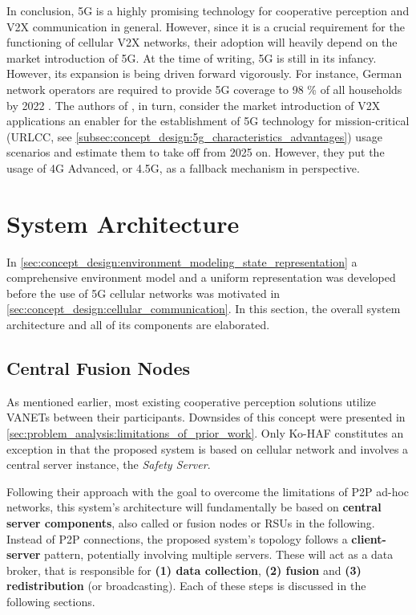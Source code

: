 In conclusion, 5G is a highly promising technology for cooperative perception and V2X communication in general. However, since it is a crucial requirement for the functioning of cellular V2X networks, their adoption will heavily depend on the market introduction of 5G. At the time of writing, 5G is still in its infancy. However, its expansion is being driven forward vigorously. For instance, German network operators are required to provide 5G coverage to 98 \% of all households by 2022 \cite{DeutscheWelle2019}. The authors of \cite{CCSInsight2018}, in turn, consider the market introduction of V2X applications an enabler for the establishment of 5G technology for mission-critical (URLCC, see \autoref{subsec:concept_design:5g_characteristics_advantages}) usage scenarios and estimate them to take off from 2025 on. However, they put the usage of 4G Advanced, or 4.5G, as a fallback mechanism in perspective.

\section{System Architecture}
\label{sec:concept_design:system_architecture}
In \autoref{sec:concept_design:environment_modeling_state_representation} a comprehensive environment model and a uniform representation was developed before the use of 5G cellular networks was motivated in \autoref{sec:concept_design:cellular_communication}. In this section, the overall system architecture and all of its components are elaborated.

\subsection{Central Fusion Nodes}
\label{subsec:concept_design:central_fusion_nodes}
As mentioned earlier, most existing cooperative perception solutions utilize VANETs between their participants. Downsides of this concept were presented in \autoref{sec:problem_analysis:limitations_of_prior_work}. Only Ko-HAF \cite{Hohm2019} constitutes an exception in that the proposed system is based on cellular network and involves a central server instance, the \textit{Safety Server}.

Following their approach with the goal to overcome the limitations of P2P ad-hoc networks, this system's architecture will fundamentally be based on \textbf{central server components}, also called or fusion nodes or RSUs in the following. Instead of P2P connections, the proposed system's topology follows a \textbf{client-server} pattern, potentially involving multiple servers. These will act as a data broker, that is responsible for \textbf{(1) data collection}, \textbf{(2) fusion} and \textbf{(3) redistribution} (or broadcasting). Each of these steps is discussed in the following sections.

